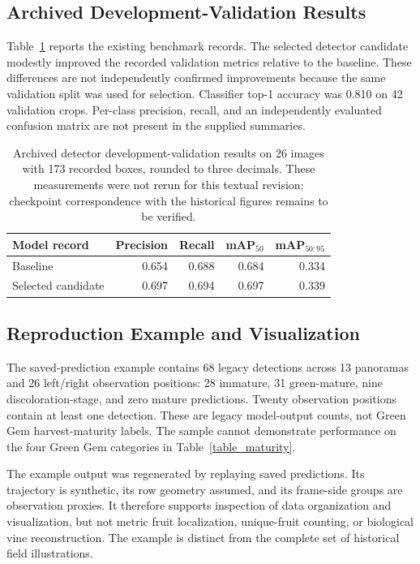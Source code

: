 \documentclass[agriengineering,article,submit,pdftex,moreauthors]{Definitions/mdpi}
\begin{document}
\subsection{Archived Development-Validation Results}
Table~\ref{tab:metrics} reports the existing benchmark records. The selected detector candidate modestly improved the recorded validation metrics relative to the baseline. These differences are not independently confirmed improvements because the same validation split was used for selection. Classifier top-1 accuracy was 0.810 on 42 validation crops. Per-class precision, recall, and an independently evaluated confusion matrix are not present in the supplied summaries.

\begin{table}[H]
\caption{Archived detector development-validation results on 26 images with 173 recorded boxes, rounded to three decimals. These measurements were not rerun for this textual revision; checkpoint correspondence with the historical figures remains to be verified.}
\centering
\begin{tabular}{lrrrr}
\toprule
Model record & Precision & Recall & mAP$_{50}$ & mAP$_{50:95}$\\
\midrule
Baseline & 0.654 & 0.688 & 0.684 & 0.334\\
Selected candidate & 0.697 & 0.694 & 0.697 & 0.339\\
\bottomrule
\end{tabular}
\label{tab:metrics}
\end{table}

\subsection{Reproduction Example and Visualization}
The saved-prediction example contains 68 legacy detections across 13 panoramas and 26 left/right observation positions: 28 immature, 31 green-mature, nine discoloration-stage, and zero mature predictions. Twenty observation positions contain at least one detection. These are legacy model-output counts, not Green Gem harvest-maturity labels. The sample cannot demonstrate performance on the four Green Gem categories in Table~\ref{table_maturity}.

The example output was regenerated by replaying saved predictions. Its trajectory is synthetic, its row geometry assumed, and its frame-side groups are observation proxies. It therefore supports inspection of data organization and visualization, but not metric fruit localization, unique-fruit counting, or biological vine reconstruction. The example is distinct from the complete set of historical field illustrations.
\end{document}
